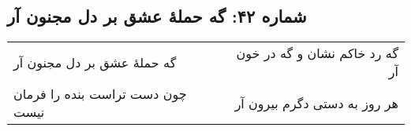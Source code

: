 \begin{center}
\section*{شماره ۴۲: گه حملۀ عشق بر دل مجنون آر}
\label{sec:042}
\begin{longtable}{l p{0.5cm} r}
گه حملهٔ عشق بر دل مجنون آر
&&
گه رد خاکم نشان و گه در خون آر
\\
چون دست تراست بنده را فرمان نیست
&&
هر روز به دستی دگرم بیرون آر
\\
\end{longtable}
\end{center}
